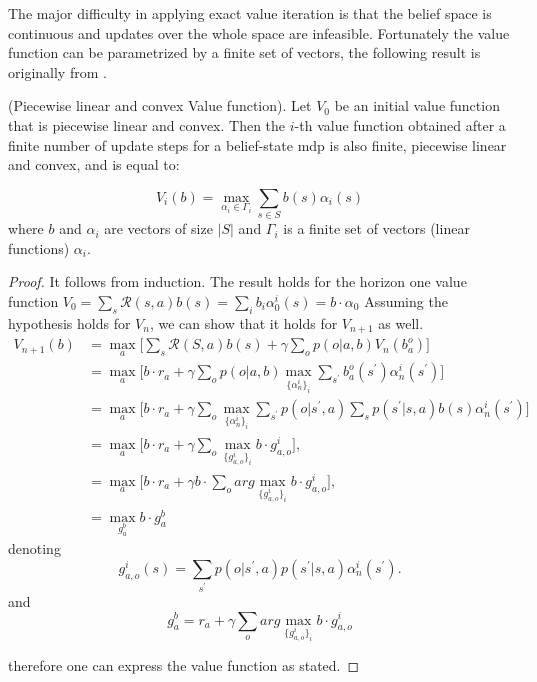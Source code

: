 The major difficulty in applying exact value iteration is that the belief space is continuous and 
updates over the whole space are infeasible. 
Fortunately the value function can be parametrized by a finite set of vectors, the following result 
is originally from \cite{1307539f-051d-3d3c-a0d8-111443bed03f}.

\begin{theorem}
    (Piecewise linear and convex Value function). Let \(V_{0}\) be an initial value function
    that is piecewise linear and convex. Then the \(i\)-th value function obtained after a finite
    number of update steps for a belief-state \gls{mdp} is also finite, piecewise linear and convex,
    and is equal to:
   
   \[
   V_{i}(b)=\max _{\alpha_{i} \in \Gamma_{i}} \sum_{s \in S} b(s) \alpha_{i}(s)
   \]
    where \(b\) and \(\alpha_{i}\) are vectors of size \(|S|\) and \(\Gamma_{i}\) is a finite set of vectors (linear functions) \(\alpha_{i}\).
\end{theorem}
\begin{proof}
It follows from induction. The result holds for the horizon one value function
$V_0 = \sum_s \mathcal{R}(s,a)b(s)= \sum_{i}b_i\alpha_{0}^{i}(s)= b \cdot \alpha_0 $
Assuming the hypothesis holds for \(V_n\), we can show that it holds for \(V_{n+1}\) as well.
\begin{align*}
    V_{n+1}(b)&=\displaystyle\max_{a}\Big[\sum_s \mathcal{R}(S,a)b(s)+\gamma\sum_{o}p(o|a,b)V_{n}(b_{a}^{o})\Big] \nonumber\\
    &=\displaystyle\max_{a}\Big[b\cdot r_{a}+\gamma\sum_{o}p(o|a,b)\max_{\{\alpha_{n}^{i}\}_{i}}\sum_{s^{\prime}}b_{a}^{o}(s^{\prime})\alpha_{n}^{i}(s^{\prime})\Big] \nonumber\\
    &=\displaystyle\max_{a}\Big[b\cdot r_{a}+\gamma\sum_{o}\max_{\{\alpha_{n}^{i}\}_{i}}\sum_{s^{\prime}}p(o|s^{\prime},a)\sum_{s}p(s^{\prime}|s,a)b(s)\alpha_{n}^{i}(s^{\prime})\Big] \nonumber\\
    &=\displaystyle\max_{a}\Big[b\cdot r_{a}+\gamma\sum_{o}\max_{\{g_{a,o}^{i}\}_{i}}b\cdot g_{a,o}^{i}\Big], \nonumber\\
    &=\displaystyle\max_{a}\Big[b\cdot r_{a}+\gamma b \cdot \sum_o arg\max_{\{g_{a,o}^{i}\}_{i}}b\cdot g_{a,o}^{i}\Big], \nonumber\\
    &=\displaystyle\max_{g_{a}^b}b \cdot g_a^b \nonumber
\end{align*}
denoting 
\[
\quad g_{a,o}^{i}(s)=\sum_{s^{\prime }}p(o|s^{\prime },a)p(s^{\prime
}|s,a)\alpha _{n}^{i}(s^{\prime }).\quad  
\]
and 
$$g_a^b = r_{a}+\gamma \sum_o arg\max_{\{g_{a,o}^{i}\}_{i}}b\cdot g_{a,o}^{i} $$

therefore one can express the value function as stated.

\end{proof}


